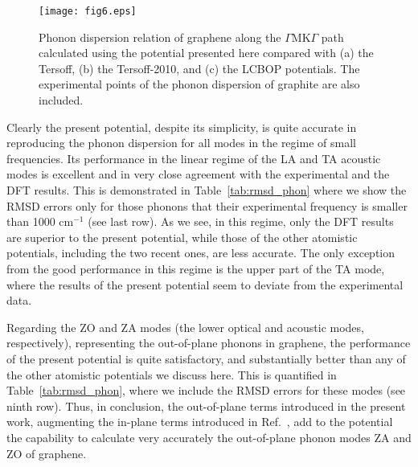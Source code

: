 \documentclass[aps,prb,floatfix,twocolumn,showpacs]{revtex4}
\begin{document}
\begin{figure}
\begin{center}
\texttt{[image: fig6.eps]}
\end{center}
\caption{Phonon dispersion relation of graphene along the 
$\Gamma$MK$\Gamma$ path calculated using the potential presented here compared with 
(a) the Tersoff, (b) the Tersoff-2010, and (c) the LCBOP potentials. The
experimental points of the phonon dispersion of 
graphite\cite{mohr,maultzch} are also included.}
\label{fig:comp_pot}
\end{figure}


Clearly the present potential, despite its simplicity,
is quite accurate in reproducing the phonon dispersion for all modes in the regime 
of small frequencies. Its performance in the linear regime 
of the LA and TA acoustic modes is excellent and in very close agreement with the experimental and 
the DFT results. This is demonstrated in Table~\ref{tab:rmsd_phon} where we show the RMSD errors
only for those phonons that their experimental frequency is smaller than 1000 cm$^{-1}$ 
(see last row).
As we see, in this regime, only the DFT results are superior to the present potential, while
those of the other atomistic potentials, including the two recent ones, are less accurate.
The only exception from the good performance in this  regime is the upper part of the TA mode,
where the results of the present potential seem to deviate from the experimental data.

Regarding the ZO and ZA modes (the lower optical and acoustic modes, respectively),
representing the out-of-plane phonons in graphene, the performance of the present potential
is quite satisfactory, and substantially better than any of the other atomistic potentials we
discuss here. This is quantified in
Table~\ref{tab:rmsd_phon}, where we include the RMSD errors for these modes (see ninth row).
Thus, in conclusion, the out-of-plane terms introduced in the present work, augmenting the
in-plane terms introduced in Ref.~, add to the potential the capability
to calculate very accurately the out-of-plane phonon modes ZA and ZO of graphene.
\end{document}
